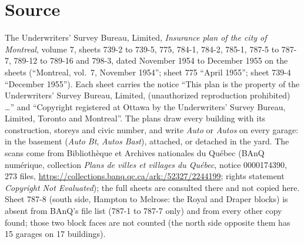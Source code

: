 \documentclass[11pt]{article}
\begin{document}
\section{Source}
The Underwriters' Survey Bureau, Limited, \emph{Insurance plan of the city of Montreal}, volume 7, sheets 739-2 to 739-5, 775, 784-1, 784-2, 785-1, 787-5 to 787-7, 789-12 to 789-16 and 798-3, dated November 1954 to December 1955 on the sheets (``Montreal, vol.~7, November 1954''; sheet 775 ``April 1955''; sheet 739-4 ``December 1955''). Each sheet carries the notice ``This plan is the property of the Underwriters' Survey Bureau, Limited, (unauthorized reproduction prohibited) \ldots'' and ``Copyright registered at Ottawa by the Underwriters' Survey Bureau, Limited, Toronto and Montreal''. The plans draw every building with its construction, storeys and civic number, and write \emph{Auto} or \emph{Autos} on every garage: in the basement (\emph{Auto Bt}, \emph{Autos Bast}), attached, or detached in the yard. The scans come from Biblioth\`eque et Archives nationales du Qu\'ebec (BAnQ num\'erique, collection \emph{Plans de villes et villages du Qu\'ebec}, notice 0000174390, 273 files, \url{https://collections.banq.qc.ca/ark:/52327/2244199}; rights statement \emph{Copyright Not Evaluated}); the full sheets are consulted there and not copied here. Sheet 787-8 (south side, Hampton to Melrose: the Royal and Draper blocks) is absent from BAnQ's file list (787-1 to 787-7 only) and from every other copy found; those two block faces are not counted (the north side opposite them has 15 garages on 17 buildings).
\end{document}

